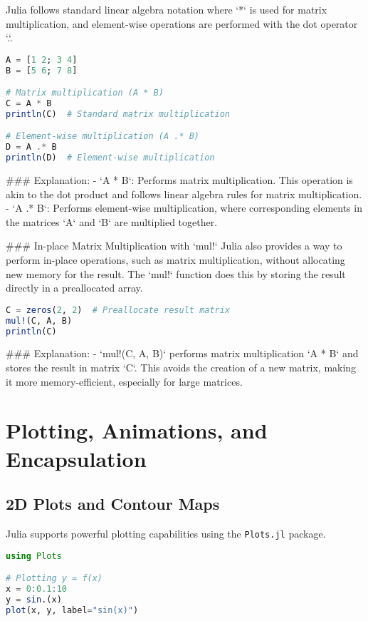 \documentclass[a4paper,12pt]{article}
\begin{document}
Julia follows standard linear algebra notation where `*` is used for matrix multiplication, and element-wise operations are performed with the dot operator `.`.

\begin{lstlisting}[language=Julia]
A = [1 2; 3 4]
B = [5 6; 7 8]

# Matrix multiplication (A * B)
C = A * B
println(C)  # Standard matrix multiplication

# Element-wise multiplication (A .* B)
D = A .* B
println(D)  # Element-wise multiplication
\end{lstlisting}

### Explanation:
- `A * B`: Performs matrix multiplication. This operation is akin to the dot product and follows linear algebra rules for matrix multiplication.
- `A .* B`: Performs element-wise multiplication, where corresponding elements in the matrices `A` and `B` are multiplied together.

### In-place Matrix Multiplication with `mul!`
Julia also provides a way to perform in-place operations, such as matrix multiplication, without allocating new memory for the result. The `mul!` function does this by storing the result directly in a preallocated array.

\begin{lstlisting}[language=Julia]
C = zeros(2, 2)  # Preallocate result matrix
mul!(C, A, B)
println(C)
\end{lstlisting}

### Explanation:
- `mul!(C, A, B)` performs matrix multiplication `A * B` and stores the result in matrix `C`. This avoids the creation of a new matrix, making it more memory-efficient, especially for large matrices.

\section{Plotting, Animations, and Encapsulation}

\subsection{2D Plots and Contour Maps}
Julia supports powerful plotting capabilities using the \texttt{Plots.jl} package.

\begin{lstlisting}[language=Julia]
using Plots

# Plotting y = f(x)
x = 0:0.1:10
y = sin.(x)
plot(x, y, label="sin(x)")
\end{lstlisting}
\end{document}
